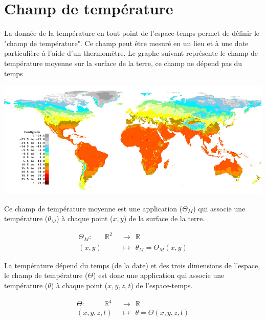 
\section{Champ de température}
%
La donnée de la température en tout point de l'espace-temps permet de définir le "champ de température". Ce champ peut être mesuré en un lieu et à une date particulière à l'aide d'un thermomètre.
Le graphe suivant représente le champ de température moyenne sur la surface de la terre, ce champ ne dépend pas du temps

\begin{center}
\includegraphics[scale=.45]{./champs/temperatures}
\end{center}



Ce champ de température moyenne est une application ($\Theta_M$) qui associe une température ($\theta_M$) à chaque point ($x,y$) de la surface de la terre.

\begin{align*}
\Theta_M :\ \ \ \ \ \ \ \ \mathbb{R} ^2 \ \  & \rightarrow \ \ \mathbb{R} \\
(x,y) \ \ & \mapsto \ \ \theta_M = \Theta_M(x,y)
\end{align*}

La température dépend du temps (de la date) et des trois dimensions de l'espace,
le champ de température ($\Theta$) est donc une application qui associe une température ($\theta$) à chaque point ($x,y,z,t$) de l'espace-temps.

\begin{align*}
\Theta :\ \ \ \ \ \ \ \ \ \ \ \ \mathbb{R} ^4 \ \  & \rightarrow \ \ \mathbb{R} \\
(x,y,z,t) \ \ & \mapsto \ \ \theta = \Theta(x,y,z,t)
\end{align*}



